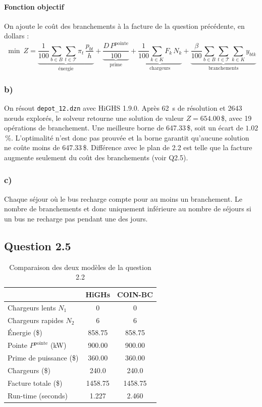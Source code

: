 \documentclass{article}
\begin{document}
\paragraph{Fonction objectif}
On ajoute le coût des branchements à la facture de la question précédente, en dollars :
\[ \min\ Z =
   \underbrace{\frac{1}{100} \sum_{b \in B} \sum_{t \in \mathcal{T}} \pi_t \, \frac{p_{bt}}{h}}_{\text{énergie}}
   + \underbrace{\frac{D \, P^{\text{pointe}}}{100}}_{\text{prime}}
   + \underbrace{\frac{1}{100} \sum_{k \in K} F_k \, N_k}_{\text{chargeurs}}
   + \underbrace{\frac{\beta}{100} \sum_{b \in B} \sum_{t \in \mathcal{T}} \sum_{k \in K} y_{btk}}_{\text{branchements}} \]


\subsubsection*{b)}
On résout \texttt{depot\_12.dzn} avec HiGHS 1.9.0. Après 62~s de résolution et 2643 nœuds explorés, le solveur retourne une solution de valeur $Z = 654.00$\,\$, avec 19 opérations de branchement. Une meilleure borne de 647.33\,\$, soit un écart de $1.02$\,\%. L'optimalité n'est donc pas prouvée et la borne garantit qu'aucune solution ne coûte moins de 647.33\,\$. Différence avec le plan de 2.2 est telle que la facture augmente seulement du coût des branchements (voir  Q2.5).


\subsubsection*{c)}
Chaque séjour où le bus recharge compte pour au moins un branchement. Le nombre de branchements et donc uniquement inférieure au nombre de séjours si un bus ne recharge pas pendant une des jours.


\subsection*{Question 2.5}
\newcommand{\modeleA}{HiGHs}
\newcommand{\modeleB}{COIN-BC}

\begin{table}[htbp]
  \caption{Comparaison des deux modèles de la question 2.2}
  \label{tab:resultats-q24}
  \begin{tabular}{lcc}
    \toprule
    & \modeleA & \modeleB \\
    \midrule
    Chargeurs lents $N_1$                  & 0  & 0 \\
    Chargeurs rapides $N_2$                & 6  & 6\\
    \midrule
    Énergie (\$)                    & 858.75 & 858.75 \\
    Pointe $P^{\text{pointe}}$ (kW) &   900.00  &  900.00 \\
    Prime de puissance (\$)         & 360.00 & 360.00 \\
    Chargeurs (\$)                  & 240.0  & 240.0 \\
    Facture totale (\$)    & 1458.75 &  1458.75\\
    \midrule
    Run-time (seconds) & 1.227 & 2.460 \\
    \bottomrule
  \end{tabular}
\end{table}
\end{document}
